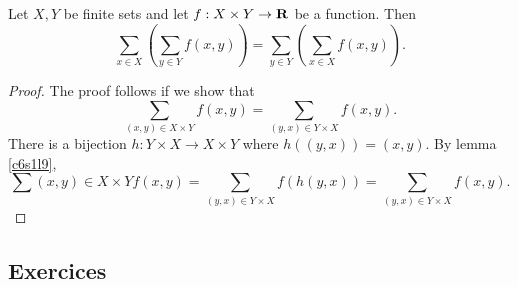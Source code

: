 \begin{thm}\label{c6s1t1}
Let $X, Y$ be finite sets and let $f: X \times Y \rightarrow \mathbf{R}$ be a
function. Then
\[
\sum_{x \in X}\left(\sum_{y \in Y} f(x, y)\right) = 
\sum_{y \in Y}\left(\sum_{x \in X} f(x, y)\right).
\]
\end{thm}
\begin{proof}
The proof follows if we show that
\[
\sum_{(x, y) \in X \times Y} f(x, y) = \sum_{(y, x) \in Y \times X}f(x, y).
\]
There is a bijection $h: Y \times X \rightarrow X \times Y$ where $h((y, x))=
(x, y)$. By lemma \ref{c6s1l9},
\[
\sum{(x, y) \in X \times Y}f(x, y) = \sum_{(y, x) \in Y \times X} f(h(y, x))
= \sum_{(y, x) \in Y \times X} f(x, y).
\]
\end{proof}

\subsection{Exercices}
